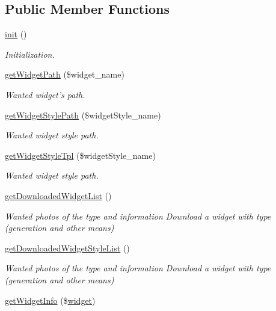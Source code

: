 \subsection*{Public Member Functions}
\begin{DoxyCompactItemize}
\item 
\hyperlink{classwidgetModel_a7bfe5611dc4916771b7ec2c148581f29}{init} ()
\begin{DoxyCompactList}\small\item\em Initialization. \end{DoxyCompactList}\item 
\hyperlink{classwidgetModel_a4d8d9f9e650ece12a4cfa4338d1a9cc5}{get\+Widget\+Path} (\$widget\+\_\+name)
\begin{DoxyCompactList}\small\item\em Wanted widget's path. \end{DoxyCompactList}\item 
\hyperlink{classwidgetModel_ae292d21337c4deb9ba7b4c0b4d794f0e}{get\+Widget\+Style\+Path} (\$widget\+Style\+\_\+name)
\begin{DoxyCompactList}\small\item\em Wanted widget style path. \end{DoxyCompactList}\item 
\hyperlink{classwidgetModel_a772aadab9c4dd23780bc3de738f63829}{get\+Widget\+Style\+Tpl} (\$widget\+Style\+\_\+name)
\begin{DoxyCompactList}\small\item\em Wanted widget style path. \end{DoxyCompactList}\item 
\hyperlink{classwidgetModel_a0035e5c87cd625a1f84d9b0a0f146e02}{get\+Downloaded\+Widget\+List} ()
\begin{DoxyCompactList}\small\item\em Wanted photos of the type and information Download a widget with type (generation and other means) \end{DoxyCompactList}\item 
\hyperlink{classwidgetModel_a417d153dcef8dd22eddd204fa0fde16f}{get\+Downloaded\+Widget\+Style\+List} ()
\begin{DoxyCompactList}\small\item\em Wanted photos of the type and information Download a widget with type (generation and other means) \end{DoxyCompactList}\item 
\hyperlink{classwidgetModel_a6e29e4176b458525680606cb376cbff1}{get\+Widget\+Info} (\$\hyperlink{classwidget}{widget})

\end{DoxyCompactItemize}
